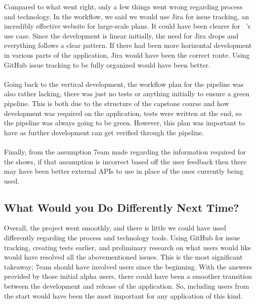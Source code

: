 \documentclass{article}
\begin{document}
Compared to what went right, only a few things went wrong regarding process and technology. In the workflow, we said we would use Jira for issue tracking, an incredibly effective website for large-scale plans. It could have been clearer for \progname ~'s use case. Since the development is linear initially, the need for Jira drops and everything follows a clear pattern. If there had been more horizontal development in various parts of the application, Jira would have been the correct route. Using GitHub issue tracking to be fully organized would have been better.
\\~\\ Going back to the vertical development, the workflow plan for the pipeline was also rather lacking, there was just no tests or anything initially to ensure a green pipeline. This is both due to the structure of the capstone course and how development was required on the application, tests were written at the end, so the pipeline was always going to be green. However, this plan was important to have as further development can get verified through the pipeline.
\\~\\ Finally, from the assumption 7eam made regarding the information required for the shows, if that assumption is incorrect based off the user feedback then there may have been better external APIs to use in place of the ones currently being used.

\subsection{What Would you Do Differently Next Time?}


\noindent Overall, the project went smoothly, and there is little we could have used differently regarding the process and technology tools. Using GitHub for issue tracking, creating tests earlier, and preliminary research on what users would like would have resolved all the abovementioned issues. This is the most significant takeaway; 7eam should have involved users since the beginning. With the answers provided by those initial alpha users, there could have been a smoother transition between the development and release of the application. So, including users from the start would have been the most important for any application of this kind.
\end{document}
